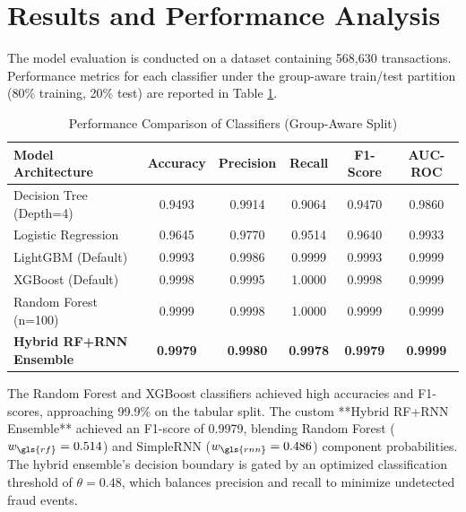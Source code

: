 \section{Results and Performance Analysis}

The model evaluation is conducted on a dataset containing 568,630 transactions. Performance metrics for each classifier under the group-aware train/test partition (80\% training, 20\% test) are reported in Table \ref{tab:model-results-comparison}.

\begin{table}[h!]
    \centering
    \caption{Performance Comparison of Classifiers (Group-Aware Split)}
    \label{tab:model-results-comparison}
    \begin{tabularx}{\textwidth}{| l | c | c | c | c | c |}
        \hline
        \textbf{Model Architecture} 
        & \textbf{Accuracy} 
        & \textbf{Precision} 
        & \textbf{Recall} 
        & \textbf{F1-Score} 
        & \textbf{AUC-ROC} \\ \hline

        Decision Tree (Depth=4) 
        & 0.9493 & 0.9914 & 0.9064 & 0.9470 & 0.9860 \\ \hline

        Logistic Regression 
        & 0.9645 & 0.9770 & 0.9514 & 0.9640 & 0.9933 \\ \hline

        LightGBM (Default) 
        & 0.9993 & 0.9986 & 0.9999 & 0.9993 & 0.9999 \\ \hline

        XGBoost (Default) 
        & 0.9998 & 0.9995 & 1.0000 & 0.9998 & 0.9999 \\ \hline

        Random Forest (n=100) 
        & 0.9999 & 0.9998 & 1.0000 & 0.9999 & 0.9999 \\ \hline

        \textbf{Hybrid RF+RNN Ensemble} 
        & \textbf{0.9979} & \textbf{0.9980} & \textbf{0.9978} & \textbf{0.9979} & \textbf{0.9999} \\ \hline
    \end{tabularx}
\end{table}

The Random Forest and XGBoost classifiers achieved high accuracies and F1-scores, approaching 99.9\% on the tabular split. The custom **Hybrid RF+RNN Ensemble** achieved an F1-score of 0.9979, blending Random Forest ($w_{\gls{rf}} = 0.514$) and SimpleRNN ($w_{\gls{rnn}} = 0.486$) component probabilities. The hybrid ensemble's decision boundary is gated by an optimized classification threshold of $\theta = 0.48$, which balances precision and recall to minimize undetected fraud events.

